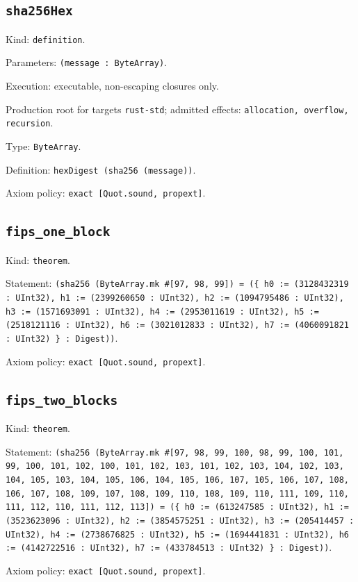 \documentclass[11pt]{article}
\begin{document}
\subsection*{\texttt{sha256Hex}}
\noindent Kind: \texttt{definition}.\par
\noindent Parameters: \texttt{(message : ByteArray)}.\par
\noindent Execution: executable, non-escaping closures only.\par
\noindent Production root for targets \texttt{rust-std}; admitted effects: \texttt{allocation, overflow, recursion}.\par
\noindent Type: \texttt{ByteArray}.\par
\noindent Definition: \texttt{hexDigest (sha256 (message))}.\par
\noindent Axiom policy: \texttt{exact [Quot.sound, propext]}.\par
\subsection*{\texttt{fips\_one\_block}}
\noindent Kind: \texttt{theorem}.\par
\noindent Statement: \texttt{(sha256 (ByteArray.mk \#[97, 98, 99]) = (\{ h0 := (3128432319 : UInt32), h1 := (2399260650 : UInt32), h2 := (1094795486 : UInt32), h3 := (1571693091 : UInt32), h4 := (2953011619 : UInt32), h5 := (2518121116 : UInt32), h6 := (3021012833 : UInt32), h7 := (4060091821 : UInt32) \} : Digest))}.\par
\noindent Axiom policy: \texttt{exact [Quot.sound, propext]}.\par
\subsection*{\texttt{fips\_two\_blocks}}
\noindent Kind: \texttt{theorem}.\par
\noindent Statement: \texttt{(sha256 (ByteArray.mk \#[97, 98, 99, 100, 98, 99, 100, 101, 99, 100, 101, 102, 100, 101, 102, 103, 101, 102, 103, 104, 102, 103, 104, 105, 103, 104, 105, 106, 104, 105, 106, 107, 105, 106, 107, 108, 106, 107, 108, 109, 107, 108, 109, 110, 108, 109, 110, 111, 109, 110, 111, 112, 110, 111, 112, 113]) = (\{ h0 := (613247585 : UInt32), h1 := (3523623096 : UInt32), h2 := (3854575251 : UInt32), h3 := (205414457 : UInt32), h4 := (2738676825 : UInt32), h5 := (1694441831 : UInt32), h6 := (4142722516 : UInt32), h7 := (433784513 : UInt32) \} : Digest))}.\par
\noindent Axiom policy: \texttt{exact [Quot.sound, propext]}.\par
\end{document}
